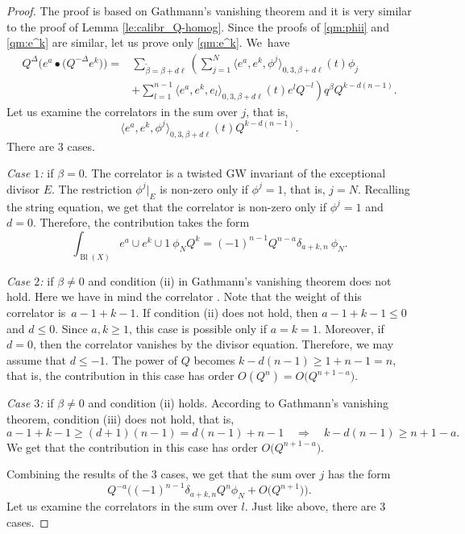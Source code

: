 \documentclass[pdftex]{sigma}
\numberwithin{equation}{section}
\begin{document}
\begin{proof}
The proof is based on Gathmann's vanishing theorem and it is very
similar to the proof of Lemma \ref{le:calibr_Q-homog}.
Since the proofs of \eqref{qm:phii} and \eqref{qm:e^k} are similar, let
us prove only \eqref{qm:e^k}. We~have
\begin{align*}
Q^\Delta \big(e^a\bullet \big(Q^{-\Delta} e^k\big) \big)={}&
\sum_{\widetilde{\beta}=\beta+d\ell}
\left(
\sum_{j=1}^N
\big\langle e^a, e^k, \phi^j\big\rangle_{0,3,\beta+ d\ell}(t)
\phi_j \right.\\
&\left.+
\sum_{l=1}^{n-1} \big\langle e^a, e^k, e_l\big\rangle_{0,3,\beta+d\ell} (t)
e^l Q^{-l}
\right) q^\beta Q^{k-d(n-1)}.
\end{align*}
Let us examine the correlators in the sum over $j$, that is,
\[
\big\langle e^a, e^k, \phi^j\big\rangle_{0,3,\beta+ d\ell}(t) Q^{k -d(n-1)}.
\]
There are 3 cases.

{\em Case $1$:} if $\beta=0$. The correlator is a twisted GW invariant
of the exceptional divisor $E$. The restriction $\phi^j|_E$ is
non-zero only if $\phi^j=1$, that is, $j=N$. Recalling the string equation, we get that
the correlator is non-zero only if $\phi^j=1$ and $d=0$. Therefore,
the contribution takes the form
\[
\int_{\operatorname{Bl}(X)} e^a\cup e^k \cup 1\ \phi_N Q^{k} =
(-1)^{n-1} Q^{n-a} \delta_{a+k,n}\ \phi_N.
\]

{\em Case $2$:} if $\beta\neq 0$ and condition (ii) in Gathmann's
vanishing theorem does not hold. Here we have in mind the correlator
. Note that the
weight of this correlator is~${a-1+k-1}$. If condition (ii) does not
hold, then $a-1+k-1\leq 0$ and $d\leq 0$. Since $a,k\geq 1$, this case
is possible only if $a=k=1$. Moreover, if $d=0$, then the correlator
vanishes by the divisor equation. Therefore, we may assume that $d\leq
-1$. The power of $Q$ becomes $k-d(n-1)\geq 1 + n-1=n$, that is, the
contribution in this case has order $O(Q^n)=O\big(Q^{n+1-a}\big)$.

{\em Case $3$:} if $\beta\neq 0$ and condition (ii) holds. According to
Gathmann's vanishing theorem, condition (iii) does not hold, that is,
\[
a-1+k-1\geq (d+1)(n-1)=d(n-1)+n-1\quad \Rightarrow\quad
k-d(n-1)\geq n+1-a.
\]
We get that the contribution in this case has order $O\big(Q^{n+1-a}\big)$.

Combining the results of the 3 cases, we get that the sum over $j$ has
the form
\[
Q^{-a} \big(
(-1)^{n-1} \delta_{a+k,n} Q^n\phi_N + O\big(Q^{n+1}\big)
\big).
\]
Let us examine the correlators in the sum over $l$. Just like above,
there are 3 cases.


\end{proof}
\end{document}
